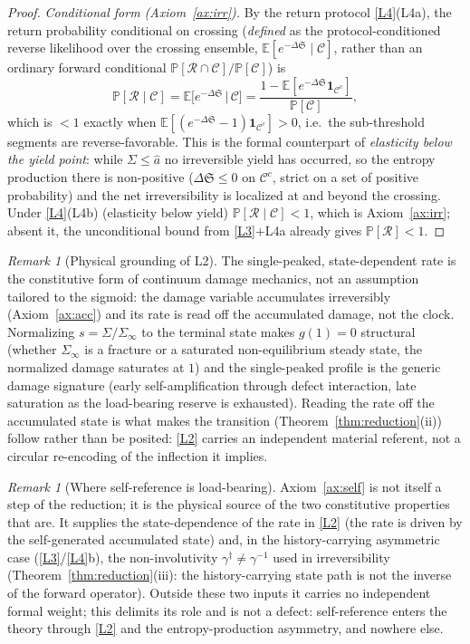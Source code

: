 \documentclass[11pt]{article}
\theoremstyle{plain}
\theoremstyle{definition}
\theoremstyle{remark}
\newtheorem{remark}[theorem]{Remark}
\newcommand{\E}{\mathbb{E}}
\newcommand{\Sep}{\mathfrak{S}}
\begin{document}
\begin{proof}
\emph{Conditional form (Axiom~\ref{ax:irr}).} By the return protocol \ref{L4}(L4a), the return probability conditional on crossing (\emph{defined} as the protocol-conditioned reverse likelihood over the crossing ensemble, $\E[e^{-\Delta\Sep}\mid\mathcal C]$, rather than an ordinary forward conditional $\mathbb P[\mathcal R\cap\mathcal C]/\mathbb P[\mathcal C]$) is
\[
\mathbb P[\mathcal R\mid\mathcal C]=\E\!\big[e^{-\Delta\Sep}\,\big|\,\mathcal C\big]=\frac{1-\E[e^{-\Delta\Sep}\mathbf 1_{\mathcal C^c}]}{\mathbb P[\mathcal C]},
\]
which is $<1$ exactly when $\E[(e^{-\Delta\Sep}-1)\mathbf 1_{\mathcal C^c}]>0$, i.e.\ the sub-threshold segments are reverse-favorable. This is the formal counterpart of \emph{elasticity below the yield point}: while $\Sigma\le\hat a$ no irreversible yield has occurred, so the entropy production there is non-positive ($\Delta\Sep\le0$ on $\mathcal C^c$, strict on a set of positive probability) and the net irreversibility is localized at and beyond the crossing. Under \ref{L4}(L4b) (elasticity below yield) $\mathbb P[\mathcal R\mid\mathcal C]<1$, which is Axiom~\ref{ax:irr}; absent it, the unconditional bound from \ref{L3}$+$L4a already gives $\mathbb P[\mathcal R]<1$.
\end{proof}

\begin{remark}[Physical grounding of L2]\label{rem:damagelaw}
The single-peaked, state-dependent rate is the constitutive form of continuum damage mechanics, not an assumption tailored to the sigmoid: the damage variable accumulates irreversibly (Axiom~\ref{ax:acc}) and its rate is read off the accumulated damage, not the clock. Normalizing $s=\Sigma/\Sigma_\infty$ to the terminal state makes $g(1)=0$ structural (whether $\Sigma_\infty$ is a fracture or a saturated non-equilibrium steady state, the normalized damage saturates at $1$) and the single-peaked profile is the generic damage signature (early self-amplification through defect interaction, late saturation as the load-bearing reserve is exhausted). Reading the rate off the accumulated state is what makes the transition (Theorem~\ref{thm:reduction}(ii)) follow rather than be posited: \ref{L2} carries an independent material referent, not a circular re-encoding of the inflection it implies.
\end{remark}

\begin{remark}[Where self-reference is load-bearing]\label{rem:a0role}
Axiom~\ref{ax:self} is not itself a step of the reduction; it is the physical source of the two constitutive properties that are. It supplies the state-dependence of the rate in \ref{L2} (the rate is driven by the self-generated accumulated state) and, in the history-carrying asymmetric case (\ref{L3}/\ref{L4}b), the non-involutivity $\gamma^\dagger\neq\gamma^{-1}$ used in irreversibility (Theorem~\ref{thm:reduction}(iii): the history-carrying state path is not the inverse of the forward operator). Outside these two inputs it carries no independent formal weight; this delimits its role and is not a defect: self-reference enters the theory through \ref{L2} and the entropy-production asymmetry, and nowhere else.
\end{remark}
\end{document}
